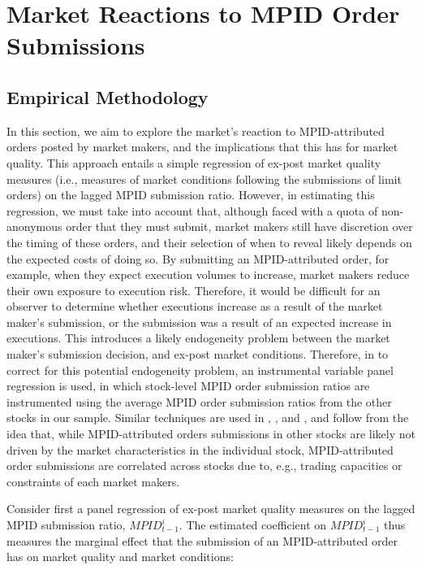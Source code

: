 \documentclass{article}
\begin{document}
\section{Market Reactions to MPID Order Submissions}\label{reactions}

\subsection{Empirical Methodology}\label{method2}

\noindent In this section, we aim to explore the market's reaction to MPID-attributed orders posted by market makers, and the implications that this has for market quality. This approach entails a simple regression of ex-post market quality measures (i.e., measures of market conditions following the submissions of limit orders) on the lagged MPID submission ratio. However, in estimating this regression, we must take into account that, although faced with a quota of non-anonymous order that they must submit, market makers still have discretion over the timing of these orders, and their selection of when to reveal likely depends on the expected costs of doing so. By submitting an MPID-attributed order, for example, when they expect execution volumes to increase, market makers reduce their own exposure to execution risk. Therefore, it would be difficult for an observer to determine whether executions increase as a result of the market maker's submission, or the submission was a result of an expected increase in executions. This introduces a likely endogeneity problem between the market maker's submission decision, and ex-post market conditions. Therefore, in to correct for this potential endogeneity problem, an instrumental variable panel regression is used, in which stock-level MPID order submission ratios are instrumented using the average MPID order submission ratios from the other stocks in our sample. Similar techniques are used in \citet{ComertonForde201570}, \citet{Hasbrouck2013646}, and \citet{buti2011diving}, and follow from the idea that, while MPID-attributed orders submissions in other stocks are likely not driven by the market characteristics in the individual stock, MPID-attributed order submissions are correlated across stocks due to, e.g., trading capacities or constraints of each market makers.

\noindent Consider first a panel regression of ex-post market quality measures on the lagged MPID submission ratio, $MPID_{t-1}^i$. The estimated coefficient on $MPID_{t-1}^i$ thus measures the marginal effect that the submission of an MPID-attributed order has on market quality and market conditions:%
\vspace{-\baselineskip}
\end{document}
